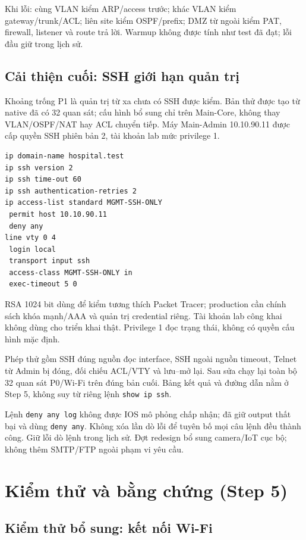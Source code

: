 \documentclass[
  11pt,
]{article}
\begin{document}
Khi lỗi: cùng VLAN kiểm ARP/access trước; khác VLAN kiểm gateway/trunk/ACL; liên site kiểm OSPF/prefix; DMZ từ ngoài kiểm PAT, firewall, listener và route trả lời. Warmup không được tính như test đã đạt; lỗi đầu giữ trong lịch sử.

\clearpage
\subsection{Cải thiện cuối: SSH giới hạn quản trị}
Khoảng trống P1 là quản trị từ xa chưa có SSH được kiểm. Bản thử được tạo từ native đã có 32 quan sát; cấu hình bổ sung chỉ trên Main-Core, không thay VLAN/OSPF/NAT hay ACL chuyển tiếp. Máy Main-Admin 10.10.90.11 được cấp quyền SSH phiên bản 2, tài khoản lab mức privilege 1.
\begin{Verbatim}[fontsize=\small]
ip domain-name hospital.test
ip ssh version 2
ip ssh time-out 60
ip ssh authentication-retries 2
ip access-list standard MGMT-SSH-ONLY
 permit host 10.10.90.11
 deny any
line vty 0 4
 login local
 transport input ssh
 access-class MGMT-SSH-ONLY in
 exec-timeout 5 0
\end{Verbatim}
RSA 1024 bit dùng để kiểm tương thích Packet Tracer; production cần chính sách khóa mạnh/AAA và quản trị credential riêng. Tài khoản lab công khai không dùng cho triển khai thật. Privilege 1 đọc trạng thái, không có quyền cấu hình mặc định.

Phép thử gồm SSH đúng nguồn đọc interface, SSH ngoài nguồn timeout, Telnet từ Admin bị đóng, đối chiếu ACL/VTY và lưu--mở lại. Sau sửa chạy lại toàn bộ 32 quan sát P0/Wi-Fi trên đúng bản cuối. Bảng kết quả và đường dẫn nằm ở Step 5, không suy từ riêng lệnh \texttt{show ip ssh}.

Lệnh \texttt{deny any log} không được IOS mô phỏng chấp nhận; đã giữ output thất bại và dùng \texttt{deny any}. Không xóa lần dò lỗi để tuyên bố mọi câu lệnh đều thành công. Giữ lỗi dò lệnh trong lịch sử. Đợt redesign bổ sung camera/IoT cục bộ; không thêm SMTP/FTP ngoài phạm vi yêu cầu.

\clearpage
\section{Kiểm thử và bằng chứng (Step 5)}

\subsection{Kiểm thử bổ sung: kết nối Wi-Fi}

\end{document}
